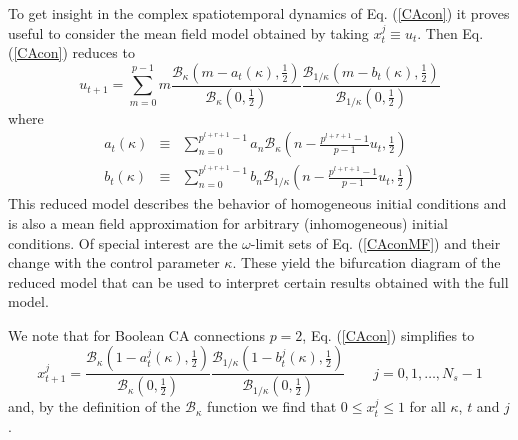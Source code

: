\documentclass[aps,pre,preprint,floatfix]{revtex4}
\theoremstyle{plain} \newtheorem{defi}{Definition}[section]
\theoremstyle{plain} \newtheorem{prop}{Proposition}[section]
\theoremstyle{plain} \newtheorem{theor}{Theorem}[section]
\theoremstyle{plain} \newtheorem{lemma}{Lemma}[section]
\theoremstyle{plain} \newtheorem*{corol}{Corollary}
\theoremstyle{remark} \newtheorem*{rem}{Remark}
\theoremstyle{plain} \newtheorem{exer}{Exercise}[section]
\theoremstyle{remark} \newtheorem*{ans}{Answer}
\begin{document}
To get insight in the complex spatiotemporal dynamics of Eq. (\ref{CAcon}) it proves useful to consider the mean field model obtained by taking $x_t^j\equiv u_t$. Then Eq. (\ref{CAcon}) reduces to
\begin{equation}
u_{t+1}=\sum_{m=0}^{p-1}m\frac{\mathcal{B}_{\kappa}\left(m-a_{t}(\kappa) ,\frac{1}{2}\right)}{\mathcal{B}_{\kappa}(0,\frac{1}{2})}\frac{\mathcal{B}_{1/\kappa}\left(m-b_{t}(\kappa) ,\frac{1}{2}\right)}{\mathcal{B}_{1/\kappa}(0,\frac{1}{2})} \label{CAconMF}
\end{equation}
where
\begin{eqnarray}
a_{t}(\kappa)&\equiv&\sum_{n=0}^{p^{l+r+1}-1}a_{n}\mathcal{B}_{\kappa}\left(n-\frac{p^{l+r+1}-1}{p-1}u_t,\frac{1}{2}\right) \label{finfiMF}\\
b_{t}(\kappa)&\equiv&\sum_{n=0}^{p^{l+r+1}-1}b_{n}\mathcal{B}_{1/\kappa}\left(n-\frac{p^{l+r+1}-1}{p-1}u_t,\frac{1}{2}\right) \label{g0MF}
\end{eqnarray} 
This reduced model describes the behavior of homogeneous initial conditions and is also a mean field approximation for arbitrary (inhomogeneous) initial conditions. Of special interest are the $\omega$-limit sets of Eq. (\ref{CAconMF}) and their change with the control parameter $\kappa$. These yield the bifurcation diagram of the reduced model that can be used to interpret certain results obtained with the full model. 

We note that for Boolean CA connections $p=2$, Eq. (\ref{CAcon}) simplifies to
\begin{equation}
x_{t+1}^{j}=\frac{\mathcal{B}_{\kappa}\left(1-a_{t}^{j}(\kappa) ,\frac{1}{2}\right)}{\mathcal{B}_{\kappa}(0,\frac{1}{2})}\frac{\mathcal{B}_{1/\kappa}\left(1-b_{t}^{j}(\kappa) ,\frac{1}{2}\right)}{\mathcal{B}_{1/\kappa}(0,\frac{1}{2})}\qquad j=0,1,\ldots,N_s-1 \label{CAconB}
\end{equation}
and, by the definition of the $\mathcal{B}_\kappa$ function we find that $0\le x_{t}^{j} \le 1$ for all $\kappa$, $t$ and $j$. 

\end{document}

